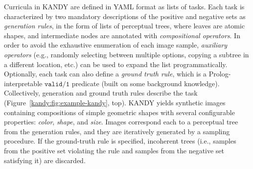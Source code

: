 Curricula in \textsc{KANDY} are defined in YAML format as lists of tasks. Each task is characterized by two mandatory descriptions of the positive and negative sets as {\it generation rules}, in the form of lists of perceptual trees, where leaves are atomic shapes, and intermediate nodes are annotated with {\it compositional operators}.  In order to avoid the exhaustive enumeration of each image sample, {\it auxiliary operators} (e.g., randomly selecting between multiple options, copying a subtree in a different location, etc.) can be used to expand the list programmatically.
Optionally, each task can also define a {\it ground truth rule}, which is a Prolog-interpretable $\texttt{valid/1}$ predicate (built on some background knowledge). Collectively, generation and ground truth rules describe the task (Figure~\ref{kandy:fig:example-kandy}, top).
KANDY yields synthetic images containing compositions of simple geometric shapes with several configurable properties: \textit{color}, \textit{shape}, and \textit{size}. 
%
Images correspond each to a perceptual tree from the generation rules, and they are iteratively generated by a sampling procedure. If the ground-truth rule is specified, incoherent trees (i.e., samples from the positive set violating the rule and samples from the negative set satisfying it) are discarded.

